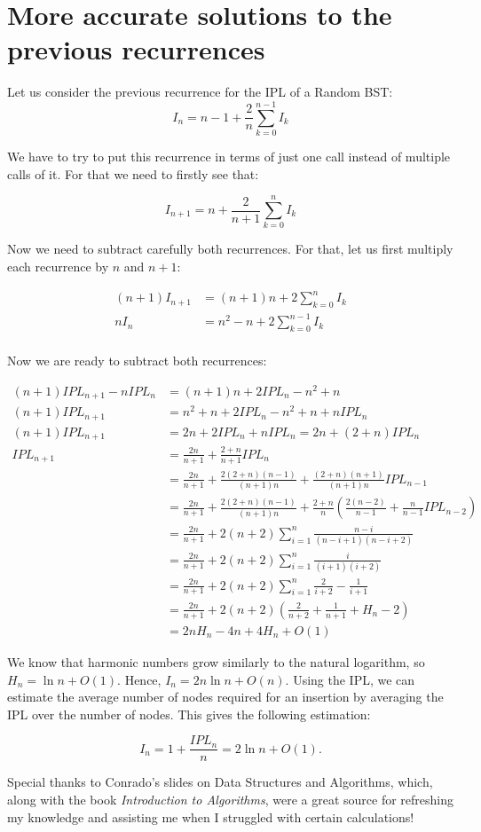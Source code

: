 \appendix
\section{More accurate solutions to the previous recurrences}
Let us consider the previous recurrence for the IPL of a Random BST:
$$
I_n = n -1 + \frac{2}{n} \sum\limits_{k = 0}^{n-1} I_k
$$

We have to try to put this recurrence in terms of just one call instead of multiple calls of it. For that we need to firstly see that:

$$
I_{n+1} = n + \frac{2}{n+1} \sum\limits_{k = 0}^{n} I_k
$$

Now we need to subtract carefully both recurrences. For that, let us first multiply each recurrence by $n$ and $n+1$:

\begin{align*}
    (n+1) I_{n+1} &= (n+1)n + 2 \sum\limits_{k = 0}^{n} I_k \\
    nI_n &= n^2 -n + 2 \sum\limits_{k = 0}^{n-1} I_k \\
\end{align*}

Now we are ready to subtract both recurrences:

\begin{align*}
    (n+1) IPL_{n+1} - nIPL_n &= (n+1)n + 2 IPL_n - n^2 + n \\
    (n+1) IPL_{n+1} &= n^2 + n + 2IPL_n - n^2 + n + nIPL_n \\
    (n+1) IPL_{n+1} &= 2n + 2IPL_n + nIPL_n = 2n + (2+n)IPL_n \\
    IPL_{n+1} &= \frac{2n}{n+1} + \frac{2+n}{n+1} IPL_n \\
     &= \frac{2n}{n+1} + \frac{2(2+n)(n-1)}{(n+1)n} + \frac{(2+n)(n+1)}{(n+1)n}IPL_{n-1} \\
     &= \frac{2n}{n+1} + \frac{2(2+n)(n-1)}{(n+1)n} + \frac{2+n}{n}(\frac{2(n-2)}{n-1} + \frac{n}{n-1} IPL_{n-2}) \\
     &= \frac{2n}{n+1} + 2(n+2)\sum\limits_{i = 1}^{n} \frac{n-i}{(n-i+1)(n-i+2)} \\
     &= \frac{2n}{n+1} + 2(n+2)\sum\limits_{i = 1}^{n} \frac{i}{(i+1)(i+2)} \\
     &= \frac{2n}{n+1} + 2(n+2)\sum\limits_{i = 1}^{n} \frac{2}{i+2} - \frac{1}{i+1} \\
     &= \frac{2n}{n+1} + 2(n+2)(\frac{2}{n+2} + \frac{1}{n+1} + H_n - 2) \\
     &= 2nH_n - 4n + 4H_n + O(1)
\end{align*}

We know that harmonic numbers grow similarly to the natural logarithm, so \( H_n = \ln n + O(1) \). Hence, \( I_n = 2n \ln n + O(n) \). Using the IPL, we can estimate the average number of nodes required for an insertion by averaging the IPL over the number of nodes. This gives the following estimation:  

\[
I_n = 1 + \frac{IPL_n}{n} = 2 \ln n + O(1).
\]

Special thanks to Conrado's slides on Data Structures and Algorithms, which, along with the book \textit{Introduction to Algorithms}, were a great source for refreshing my knowledge and assisting me when I struggled with certain calculations!
